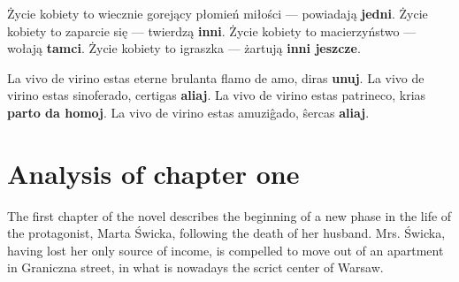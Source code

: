 
Życie kobiety to wiecznie gorejący płomień miłości --- powiadają \textbf{jedni}.
Życie kobiety to zaparcie się --- twierdzą \textbf{inni}.
Życie kobiety to macierzyństwo --- wołają \textbf{tamci}.
Życie kobiety to igraszka --- żartują \textbf{inni jeszcze}.

La vivo de virino estas eterne brulanta flamo de amo, diras \textbf{unuj}. La vivo de virino estas sinoferado, certigas \textbf{aliaj}. La vivo de virino estas patrineco, krias \textbf{parto da homoj}. La vivo de virino estas amuziĝado, ŝercas \textbf{aliaj}.

\section{Analysis of chapter one}

The first chapter of the novel describes the beginning of a new phase in the life of the protagonist, Marta Świcka, following the death of her husband.
Mrs. Świcka, having lost her only source of income, is compelled to move out of an apartment in Graniczna street, in what is nowadays the scrict center of Warsaw.
